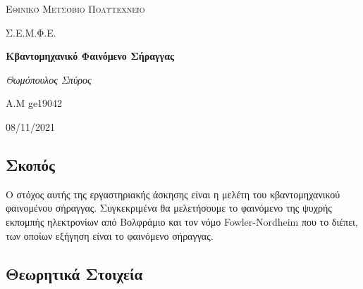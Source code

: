 \documentclass[a4paper]{article}
\begin{document}
\begin{titlepage}			%
	\centering
	{\scshape\LARGE Εθινικό Μετσόβιο Πολυτεχνείο\par}
	{\scshape \LARGE Σ.Ε.Μ.Φ.Ε.\par}
	\vspace{1cm}
	{\huge\bfseries Κβαντομηχανικό Φαινόμενο Σήραγγας\par}
	\vspace{1cm}
	{\Large\itshape Θωμόπουλος Σπύρος\par}		%
	
	{\large A.M ge19042 \hfill \\}%
	\vspace{1cm}
	{\large 08/11/2021\par}
\end{titlepage}


\newpage 

\subsection*{Σκοπός}
Ο στόχος αυτής της εργαστηριακής άσκησης είναι η μελέτη του κβαντομηχανικού φαινομένου σήραγγας.
	 Συγκεκριμένα θα μελετήσουμε το φαινόμενο της ψυχρής εκπομπής ηλεκτρονίων από Βολφράμιο και τον νόμο Fowler-Nordheim που το διέπει, των οποίων εξήγηση είναι το φαινόμενο σήραγγας.
\subsection*{Θεωρητικά Στοιχεία}
\end{document}
